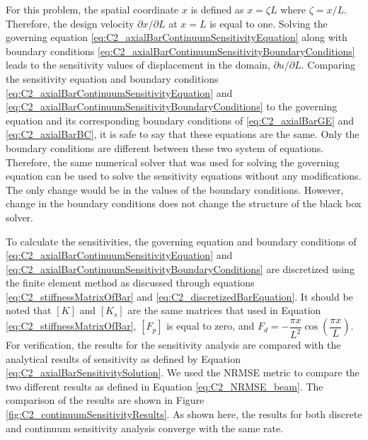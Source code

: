 For this problem, the spatial coordinate $x$ is defined as $x = \zeta L$ where $\zeta = x / L$. Therefore, the design velocity $\partial x/\partial L$ at $x = L$ is equal to one. Solving the governing equation \eqref{eq:C2_axialBarContinuumSensitivityEquation} along with boundary conditions \eqref{eq:C2_axialBarContinuumSensitivityBoundaryConditions} leads to the sensitivity values of displacement in the domain, $\partial u/\partial L$. Comparing the sensitivity equation and boundary conditions \eqref{eq:C2_axialBarContinuumSensitivityEquation} and \eqref{eq:C2_axialBarContinuumSensitivityBoundaryConditions} to the governing equation and its corresponding boundary conditions of \eqref{eq:C2_axialBarGE} and \eqref{eq:C2_axialBarBC}, it is safe to say that these equations are the same. Only the boundary conditions are different between these two system of equations. Therefore, the same numerical solver that was used for solving the governing equation can be used to solve the sensitivity equations without any modifications. The only change would be in the values of the boundary conditions. However, change in the boundary conditions does not change the structure of the black box solver.

To calculate the sensitivities, the governing equation and boundary conditions of \eqref{eq:C2_axialBarContinuumSensitivityEquation} and \eqref{eq:C2_axialBarContinuumSensitivityBoundaryConditions} are discretized using the finite element method as discussed through equations \eqref{eq:C2_stiffnessMatrixOfBar} and \eqref{eq:C2_discretizedBarEquation}. It should be noted that $[K]$ and $[K_s]$ are the same matrices that used in Equation \eqref{eq:C2_stiffnessMatrixOfBar}, $[F_p]$ is equal to zero, and $F_d = -\dfrac{\pi x}{L^2} \cos \left( \dfrac{\pi x}{L} \right)$. For verification, the results for the sensitivity analysis are compared with the analytical results of sensitivity as defined by Equation \eqref{eq:C2_axialBarSensitivitySolution}. We used the NRMSE metric to compare the two different results as defined in Equation \eqref{eq:C2_NRMSE_beam}. The comparison of the results are shown in Figure \ref{fig:C2_continuumSensitivityResults}. As shown here, the results for both discrete and continuum sensitivity analysis converge with the same rate.

